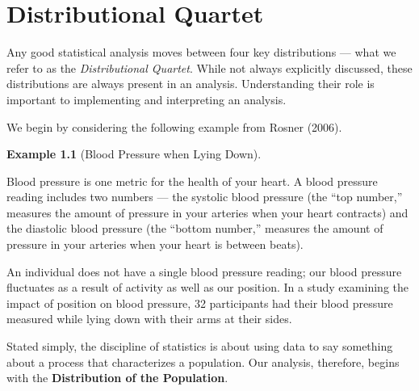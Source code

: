 \documentclass[
  letterpaper,
  DIV=11,
  numbers=noendperiod]{scrreprt}
\theoremstyle{definition}
\newtheorem{example}{Example}[chapter]
\theoremstyle{definition}
\theoremstyle{remark}
\begin{document}
\hypertarget{sec-distributional-quartet}{%
\chapter{Distributional Quartet}\label{sec-distributional-quartet}}

\providecommand{\norm}[1]{\lVert#1\rVert}
\providecommand{\abs}[1]{\lvert#1\rvert}
\providecommand{\dist}[1]{\stackrel{\text{#1}}{\sim}}
\providecommand{\ind}[1]{\mathbb{I}\left(#1\right)}
\providecommand{\bm}[1]{\mathbf{#1}}
\providecommand{\bs}[1]{\boldsymbol{#1}}
\providecommand{\Ell}{\mathcal{L}}
\providecommand{\indep}{\perp\negthickspace\negmedspace\perp}

Any good statistical analysis moves between four key distributions ---
what we refer to as the \emph{Distributional Quartet}. While not always
explicitly discussed, these distributions are always present in an
analysis. Understanding their role is important to implementing and
interpreting an analysis.

We begin by considering the following example from Rosner (2006).

\begin{example}[Blood Pressure when Lying
Down]\protect\hypertarget{exm-distributional-quartet-bp}{}\label{exm-distributional-quartet-bp}

Blood pressure is one metric for the health of your heart. A blood
pressure reading includes two numbers --- the systolic blood pressure
(the ``top number,'' measures the amount of pressure in your arteries
when your heart contracts) and the diastolic blood pressure (the
``bottom number,'' measures the amount of pressure in your arteries when
your heart is between beats).

An individual does not have a single blood pressure reading; our blood
pressure fluctuates as a result of activity as well as our position. In
a study examining the impact of position on blood pressure, 32
participants had their blood pressure measured while lying down with
their arms at their sides.

\end{example}

Stated simply, the discipline of statistics is about using data to say
something about a process that characterizes a population. Our analysis,
therefore, begins with the \textbf{Distribution of the Population}.
\end{document}
